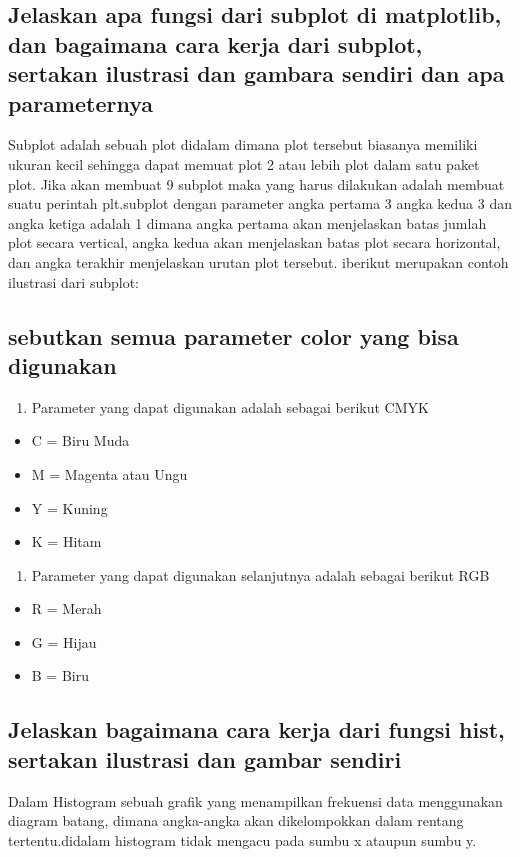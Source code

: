 

\subsection {Jelaskan apa fungsi dari subplot di matplotlib, dan bagaimana cara kerja dari subplot, sertakan ilustrasi dan gambara sendiri dan apa parameternya}
Subplot adalah sebuah plot didalam dimana plot tersebut biasanya memiliki ukuran kecil sehingga dapat memuat plot 2 atau lebih plot dalam satu paket plot. 
Jika akan membuat 9 subplot maka yang harus dilakukan adalah membuat suatu perintah plt.subplot dengan parameter angka pertama 3 angka kedua 3 dan angka ketiga adalah 1 dimana angka pertama akan menjelaskan batas jumlah plot secara vertical, angka kedua akan menjelaskan batas plot secara horizontal, dan angka terakhir menjelaskan urutan plot tersebut.
iberikut merupakan contoh ilustrasi dari subplot:



\subsection {sebutkan semua parameter color yang bisa digunakan}
\begin{enumerate}
	\item Parameter yang dapat digunakan adalah sebagai berikut CMYK
\end{enumerate}

\begin{itemize}
	\item C = Biru Muda
	\item M = Magenta atau Ungu
	\item Y = Kuning
	\item K = Hitam
\end{itemize}

\begin{enumerate}
	\item Parameter yang dapat digunakan selanjutnya adalah sebagai berikut RGB
\end{enumerate}

\begin{itemize}
	\item R = Merah
	\item G = Hijau
	\item B = Biru
\end{itemize}
\subsection {Jelaskan bagaimana cara kerja  dari fungsi hist, sertakan ilustrasi dan gambar sendiri}
Dalam Histogram sebuah  grafik yang menampilkan frekuensi data menggunakan diagram batang, dimana angka-angka akan  dikelompokkan dalam rentang tertentu.didalam histogram tidak mengacu pada sumbu x ataupun sumbu y.

